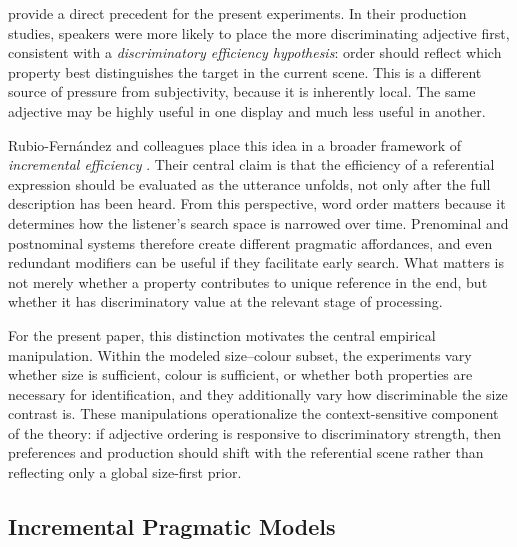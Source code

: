 \documentclass[man,floatsintext]{apa7}
\begin{document}
\citet{fukumura2018ordering} provide a direct precedent for the present experiments.
In their production studies, speakers were more likely to place the more discriminating adjective first, consistent with a \emph{discriminatory efficiency hypothesis}: order should reflect which property best distinguishes the target in the current scene.
This is a different source of pressure from subjectivity, because it is inherently local.
The same adjective may be highly useful in one display and much less useful in another.

Rubio-Fern\'andez and colleagues place this idea in a broader framework of \emph{incremental efficiency} \citep{rubio2020incrementality,rubio2021wordorder}.
Their central claim is that the efficiency of a referential expression should be evaluated as the utterance unfolds, not only after the full description has been heard.
From this perspective, word order matters because it determines how the listener's search space is narrowed over time.
Prenominal and postnominal systems therefore create different pragmatic affordances, and even redundant modifiers can be useful if they facilitate early search.
What matters is not merely whether a property contributes to unique reference in the end, but whether it has discriminatory value at the relevant stage of processing.

For the present paper, this distinction motivates the central empirical manipulation.
Within the modeled size--colour subset, the experiments vary whether size is sufficient, colour is sufficient, or whether both properties are necessary for identification, and they additionally vary how discriminable the size contrast is.
These manipulations operationalize the context-sensitive component of the theory: if adjective ordering is responsive to discriminatory strength, then preferences and production should shift with the referential scene rather than reflecting only a global size-first prior.

\subsection{Incremental Pragmatic Models}
\label{sec:bg:incremental}
\end{document}
